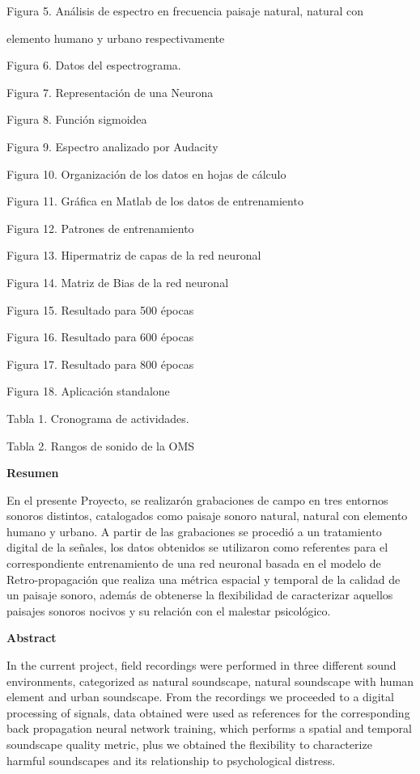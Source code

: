 Figura 5. An\'{a}lisis de espectro en frecuencia paisaje natural, natural
con

elemento humano y urbano respectivamente

Figura 6. Datos del espectrograma.

Figura 7. Representaci\'{o}n de una Neurona

Figura 8. Funci\'{o}n sigmoidea

Figura 9. Espectro analizado por Audacity

Figura 10. Organizaci\'{o}n de los datos en hojas de c\'{a}lculo

Figura 11. Gr\'{a}fica en Matlab de los datos de entrenamiento

Figura 12. Patrones de entrenamiento

Figura 13. Hipermatriz de capas de la red neuronal

Figura 14. Matriz de Bias de la red neuronal

Figura 15. Resultado para 500 \'{e}pocas

Figura 16. Resultado para 600 \'{e}pocas

Figura 17. Resultado para 800 \'{e}pocas

Figura 18. Aplicaci\'{o}n standalone

Tabla 1. Cronograma de actividades.

Tabla 2. Rangos de sonido de la OMS

\textbf{Resumen }

En el presente Proyecto, se realizar\'{o}n grabaciones de campo en tres
entornos sonoros distintos, catalogados como paisaje sonoro natural, natural
con elemento humano y urbano. A partir de las grabaciones se procedi\'{o} a
un tratamiento digital de la se\~{n}ales, los datos obtenidos se utilizaron
como referentes para el correspondiente entrenamiento de una red neuronal
basada en el modelo de Retro-propagaci\'{o}n que realiza una m\'{e}trica
espacial y temporal de la calidad de un paisaje sonoro, adem\'{a}s de
obtenerse la flexibilidad de caracterizar aquellos paisajes sonoros nocivos
y su relaci\'{o}n con el malestar psicol\'{o}gico.

\textbf{Abstract }

In the current project, field recordings were performed in three different
sound environments, categorized as natural soundscape, natural soundscape
with human element and urban soundscape. From the recordings we proceeded to
a digital processing of signals, data obtained were used as references for
the corresponding back propagation neural network training, which performs a
spatial and temporal soundscape quality metric, plus we obtained the
flexibility to characterize harmful soundscapes and its relationship to
psychological distress.

